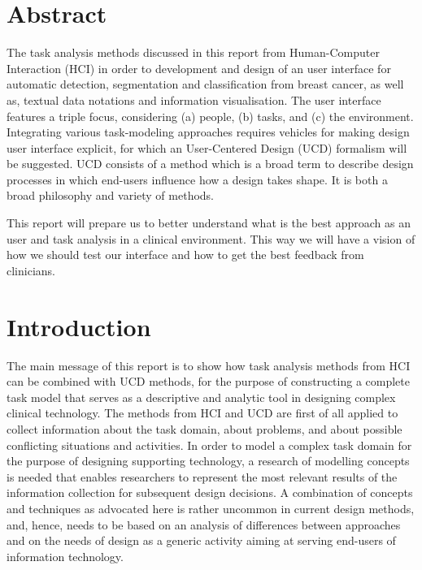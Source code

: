 \section{Abstract}

The task analysis methods discussed in this report from Human-Computer Interaction (HCI) in order to development and design of an user interface for automatic detection, segmentation and classification from breast cancer, as well as, textual data notations and information visualisation. The user interface features a triple focus, considering (a) people, (b) tasks, and (c) the environment. Integrating various task-modeling approaches requires vehicles for making design user interface explicit, for which an User-Centered Design (UCD) \cite{abras2004user} formalism will be suggested. UCD consists of a method which is a broad term to describe design processes in which end-users influence how a design takes shape. It is both a broad philosophy and variety of methods.

This report will prepare us to better understand what is the best approach as an user and task analysis in a clinical environment. This way we will have a vision of how we should test our interface and how to get the best feedback from clinicians.

\clearpage

\section{Introduction}

The main message of this report is to show how task analysis methods from HCI can be combined with UCD methods, for the purpose of constructing a complete task model that serves as a descriptive and analytic tool in designing complex clinical technology. The methods from HCI and UCD are first of all applied to collect information about the task domain, about problems, and about possible conflicting situations and activities. In order to model a complex task domain for the purpose of designing supporting technology, a research of modelling concepts is needed that enables researchers to represent the most relevant results of the information collection for subsequent design decisions. A combination of concepts and techniques as advocated here is rather uncommon in current design methods, and, hence, needs to be based on an analysis of differences between approaches and on the needs of design as a generic activity aiming at serving end-users of information technology. 

